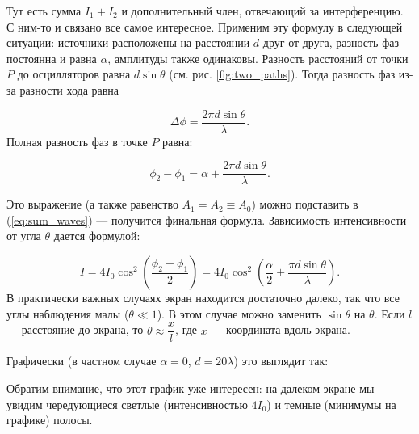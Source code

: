 \documentclass[12pt,a4paper]{article}
\numberwithin{equation}{section}
\numberwithin{equation}{section}
\begin{document}
Тут есть сумма $I_1 + I_2$ и дополнительный член, отвечающий за
интерференцию. С ним-то и связано все самое интересное. Применим эту
формулу в следующей ситуации: источники расположены на расстоянии $d$
друг от друга, разность фаз постоянна и равна $\alpha$, амплитуды
также одинаковы. Разность расстояний от точки $P$ до осцилляторов
равна $d\sin \theta$ (см. рис. \ref{fig:two_paths}). Тогда разность фаз
из-за разности хода равна

\begin{equation}
\Delta \phi = \frac{2\pi d \sin \theta}{\lambda}.
\end{equation}
Полная разность фаз в точке $P$ равна:

\begin{equation}
\phi_2 - \phi_1 = \alpha + \frac{2\pi d \sin \theta}{\lambda}.
\end{equation}

Это выражение (а также равенство $A_1 = A_2 \equiv A_0$) можно подставить в (\ref{eq:sum_waves}) --- получится финальная формула. Зависимость интенсивности от угла $\theta$ дается формулой:

\begin{equation}
I = 4I_0 \cos^2 \left( \frac{\phi_2 - \phi_1}{2} \right) = 4I_0 \cos^2 \left( \frac{\alpha}{2} + \frac{\pi d \sin \theta}{\lambda} \right).
\end{equation}
В практически важных случаях экран находится достаточно далеко, так что все углы наблюдения малы ($\theta \ll 1$). В этом случае можно заменить $\sin \theta$ на $\theta$. Если $l$ --- расстояние до экрана, то $\theta \approx \dfrac{x}{l}$, где $x$ --- координата вдоль экрана.

Графически (в частном случае $\alpha = 0$, $d = 20 \lambda $) это выглядит так: 

\begin{center}
\end{center}

Обратим внимание, что этот график уже интересен: на далеком экране мы
увидим чередующиеся светлые (интенсивностью $4I_0$) и темные (минимумы
на графике) полосы.
\end{document}
